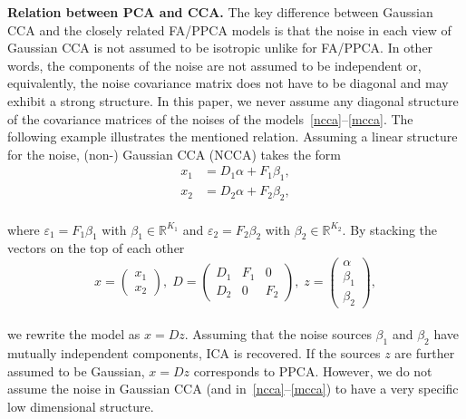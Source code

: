 \documentclass{article}
\newcommand{\ppp}{\textbf}
\newcommand{\zero}{0}
\newcommand{\R}{\mathbb{R}}
\begin{document}
\ppp{Relation between PCA and CCA.}
The key difference between Gaussian CCA and the closely related FA/PPCA models is that the noise in each view of Gaussian CCA is not assumed to be isotropic unlike for FA/PPCA. 
In other words, the components of the noise are not assumed to be independent or, equivalently, the noise covariance matrix does not have to be diagonal and may exhibit a strong structure.
In this paper, we never assume any diagonal structure of the covariance matrices of the noises of the models~\eqref{ncca}--\eqref{mcca}.
The following example illustrates the mentioned relation. Assuming  a linear structure for the noise, (non-) Gaussian CCA (NCCA) takes the form
\\[-0.6em]
\begin{equation}
\label{linear-cca}
\begin{aligned}
x_1 & = D_1\alpha + F_1 \beta_1, \\
x_2 & = D_2\alpha + F_2 \beta_2,
\end{aligned}
\end{equation}
\\[-0.4em]
where $\varepsilon_1 = F_1\beta_1$ with $\beta_1\in\R^{K_1}$ and $\varepsilon_2 = F_2\beta_2$ with $\beta_2\in\R^{K_2}$. By stacking the vectors on the top of each other
\\[-1.5em]
\begin{equation}
\label{stacking}
x = \begin{pmatrix} x_1 \\ x_2 \end{pmatrix}, \; D = \begin{pmatrix} D_1 & F_1 & \zero \\ D_2 & \zero & F_2 \end{pmatrix}, \; z = \begin{pmatrix} \alpha \\ \beta_1 \\ \beta_2 \end{pmatrix},
\end{equation}
\\[-1.0em]
we rewrite the model as
$x = D z$. Assuming that the noise sources $\beta_1$ and $\beta_2$ have mutually independent components, ICA is recovered. If the sources $z$ are further assumed to be Gaussian, $x=Dz$ corresponds to PPCA.
However, we do not assume the noise in Gaussian CCA (and in~\eqref{ncca}--\eqref{mcca}) to have a very specific low dimensional structure.
\end{document}
